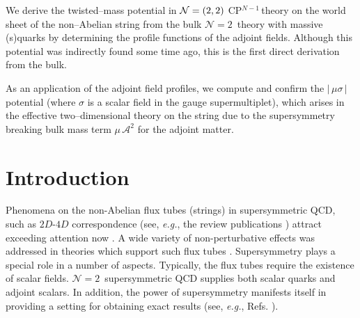 \documentclass[12pt]{article}
\newcommand{\ntwo}{${\mathcal N}=2$}
\newcommand{\ntwon}{${\mathcal N}=2$}
\newcommand{\ca}{{\mathcal A}}
\newcommand{\cpn}{CP$^{N-1}$\,}
\begin{document}
\begin{titlepage}
	We derive  the twisted--mass potential in $ {\cal N}=(2,2) $ \cpn theory 
	on the world sheet of the non--Abelian string from the bulk \ntwo\, theory with massive (s)quarks
	by determining the profile functions of the adjoint fields.
	Although this potential was indirectly found some time ago, this is the first  
	direct derivation from the bulk.

	As an application of the adjoint field profiles, we compute and confirm the $ |\, \mu \sigma \,| $ potential 
	(where $\sigma$ is a scalar field in the gauge supermultiplet),
	which arises in the effective two--dimensional theory on the string 
	due to the supersymmetry breaking bulk mass term $ \mu\, \ca^2 $ for the adjoint matter.

\vspace{2cm}


\end{titlepage}




\section{Introduction}
\setcounter{equation}{0}

	Phenomena on the non-Abelian flux tubes (strings)  in supersymmetric QCD, such as $2D$-$4D$ 
	correspondence (see, {\it e.g.}, the review publications
	\cite{Trev,SYrev})
	attract exceeding attention now \cite{GGS}.
	A wide variety of non-perturbative effects was addressed in theories 
	which support such flux tubes
	\cite{Shifman:2010id}.
	Supersymmetry plays a special role in a number of aspects.
	Typically, the flux tubes require the existence of scalar fields. 
	\ntwon\, supersymmetric QCD supplies both scalar quarks and adjoint scalars. In addition,
	the power of supersymmetry manifests itself in providing a setting for obtaining
	 exact results (see, {\it e.g.}, Refs.
	\cite{Novikov:1983uc,Seiberg:1994rs,Seiberg:1994aj,Shifman:2013ewa}).
\end{document}
